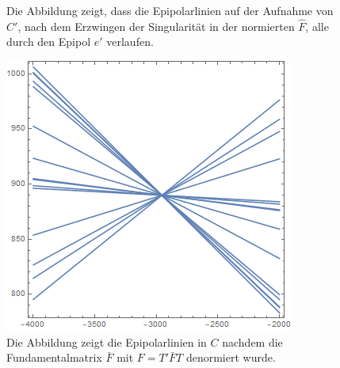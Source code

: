 \begin{figure}[!htb]
	\caption[Epipolarlinien in $C'$ aus singulärer Fundamentalmatrix ]{Die Abbildung zeigt, dass die Epipolarlinien auf der Aufnahme von $C'$, nach dem Erzwingen der Singularität in der normierten $\hat{F}$, alle durch den Epipol $e'$ verlaufen.}
	\label{fig:EpipoleWithF2}
	\endminipage\hfill
\end{figure}

\begin{figure}[!htb]
	\includegraphics[width=\linewidth]{images/L_PC1_F_Constraint_denormalized.png}
	\caption[Epipolarlinien in $C$ aus singulärer denormierter Fundamentalmatrix]{Die Abbildung zeigt die Epipolarlinien in $C$ nachdem die Fundamentalmatrix $\bar{F}$ mit $F = T'\bar{F}T$ denormiert wurde.}
	\label{fig:EpipoleWithF1Denorm}
	\endminipage\hfill

\end{figure}
